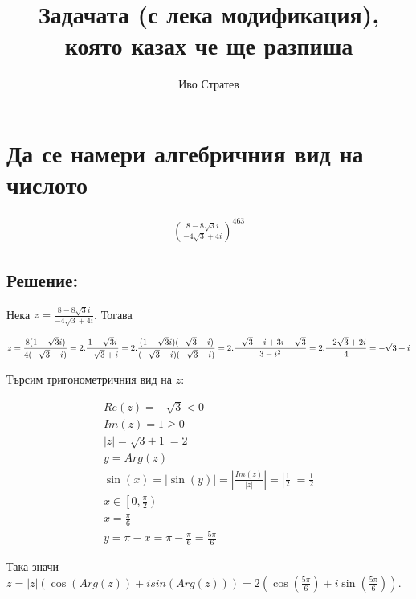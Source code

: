 \documentclass{article}[12pt]
\title{Задачата (с лека модификация), която казах че ще разпиша}
\author{Иво Стратев}
\begin{document}
\maketitle

\section*{Да се намери алгебричния вид на числото}
\begin{align*}
\displaystyle{\left(\frac{8 - 8\sqrt{3}i}{-4\sqrt{3} + 4i}\right)^{463}}
\end{align*}

\subsection*{Решение:}

Нека \(z = \displaystyle{\frac{8 - 8\sqrt{3}i}{-4\sqrt{3} + 4i}}\). Тогава

\vspace{0.5cm}

\(z = \displaystyle{\frac{8(1 - \sqrt{3}i)}{4(-\sqrt{3} + i)}}
= 2.\displaystyle{\frac{1 - \sqrt{3}i}{-\sqrt{3} + i}}
= 2.\displaystyle{\frac{(1 - \sqrt{3}i)(-\sqrt{3} - i)}{(-\sqrt{3} + i)(-\sqrt{3} - i)}}
= \\ 2.\displaystyle{\frac{-\sqrt{3} - i + 3i - \sqrt{3}}{3 - i^2}}
=  2.\displaystyle{\frac{-2\sqrt{3} + 2i}{4}} = -\sqrt{3} + i \)

\vspace{0.5cm}

Търсим тригонометричния вид на \(z\):

\vspace{0.5cm}

\begin{align*}
Re(z) = -\sqrt{3} < 0\\
Im(z) = 1 \geq 0 \\
|z| = \sqrt{3 + 1} = 2 \\
y = Arg(z) \\
\sin(x) = |\sin(y)| = \left|\displaystyle{\frac{Im(z)}{|z|}}\right| = \left|\displaystyle{\frac{1}{2}}\right| =  \frac{1}{2} \\
x \in \left[0, \displaystyle{\frac{\pi}{2}}\right) \\
x = \displaystyle{\frac{\pi}{6}} \\
y = \pi - x = \pi - \displaystyle{\frac{\pi}{6}} = \displaystyle{\frac{5\pi}{6}}
\end{align*}

Така значи \(z = |z|(\cos(Arg(z)) + i sin(Arg(z)))
= 2\left(\cos\left(\displaystyle{\frac{5\pi}{6}}\right) + i\sin\left(\displaystyle{\frac{5\pi}{6}}\right)\right)\).
\end{document}
